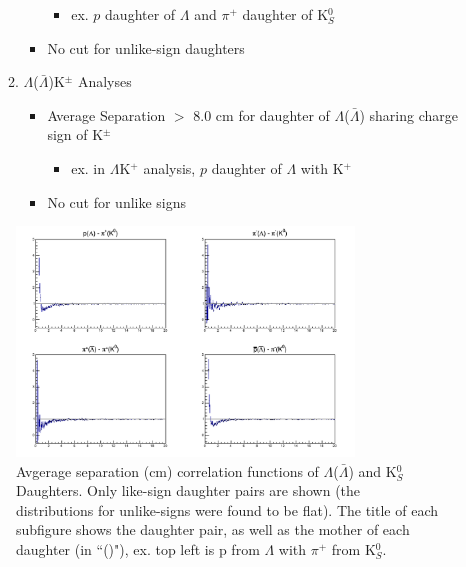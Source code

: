 \documentclass[../AnalysisNoteJBuxton.tex]{subfiles}
\begin{document}
\begin{enumerate}
\begin{enumerate}
\begin{itemize}
\begin{itemize}
    \item ex. $p$ daughter of $\Lambda$ and $\pi^{+}$ daughter of K$^{0}_{S}$
   \end{itemize}
   \item No cut for unlike-sign daughters
  \end{itemize}
  \item $\Lambda$($\bar{\Lambda}$)K$^{\pm}$ Analyses
  \begin{itemize}
   \item Average Separation $>$ 8.0 cm for daughter of $\Lambda$($\bar{\Lambda}$) sharing charge sign of K$^{\pm}$
   \begin{itemize}
    \item ex. in $\Lambda$K$^{+}$ analysis, $p$ daughter of $\Lambda$ with K$^{+}$
   \end{itemize}
   \item No cut for unlike signs
  \end{itemize}
 \end{enumerate}
\end{enumerate}

\begin{figure}[h]
  \centering
  \includegraphics[width=0.8\textwidth]{3_DataSelection/Figures/AvgSepCFs_LamK0.pdf}
  \caption[Avgerage Separation of $\Lambda$($\bar{\Lambda}$) and K$^{0}_{S}$ Daughters]{Avgerage separation (cm) correlation functions of $\Lambda$($\bar{\Lambda}$) and K$^{0}_{S}$ Daughters.  Only like-sign daughter pairs are shown (the distributions for unlike-signs were found to be flat).  The title of each subfigure shows the daughter pair, as well as the mother of each daughter (in ``()"),  ex. top left is p from $\Lambda$ with $\pi^{+}$ from K$^{0}_{S}$.}
  \label{fig:AvgSepLamK0}
\end{figure}
\end{document}
